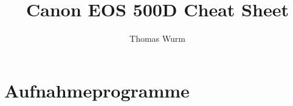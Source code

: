 \documentclass[a4paper,DIV10,12pt,headsepline,headings=small,oneside]{scrbook}
\title{Canon EOS 500D Cheat Sheet}
\author{Thomas Wurm}
\begin{document}
\maketitle

\tableofcontents 

\chapter{Aufnahmeprogramme}
\label{chap:progs}






\end{document}
